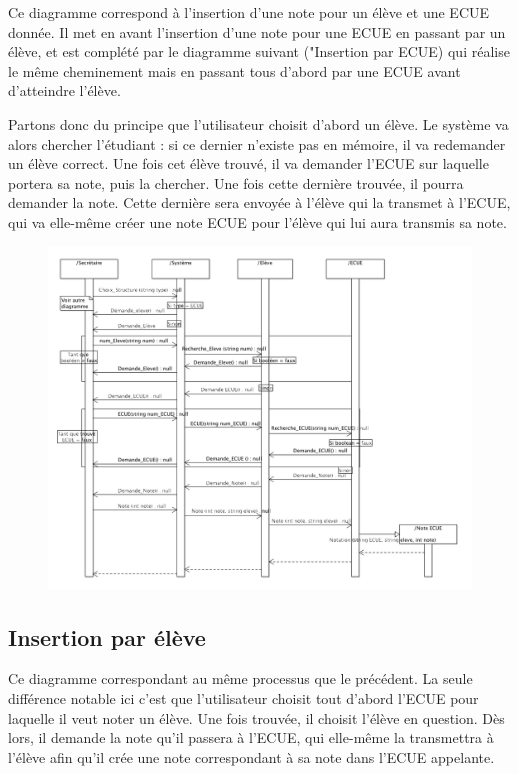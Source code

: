 \documentclass[letter, 11pt] {article}
\begin{document}
		Ce diagramme correspond à l’insertion d’une note pour un élève et une ECUE donnée. Il met en avant l’insertion d’une note pour une ECUE en passant par un élève, et est complété par le diagramme suivant ("Insertion par ECUE) qui réalise le même cheminement mais en passant tous d’abord par une ECUE avant d’atteindre l’élève.
		
		Partons donc du principe que l’utilisateur choisit d’abord un élève. Le système va alors chercher l’étudiant : si ce dernier n’existe pas en mémoire, il va redemander un élève correct. Une fois cet élève trouvé, il va demander l’ECUE sur laquelle portera sa note, puis la chercher. Une fois cette dernière trouvée, il pourra  demander la note. Cette dernière sera envoyée à l’élève qui la transmet à l’ECUE, qui va elle-même créer une note ECUE pour l’élève qui lui aura transmis sa note.
		
		
		\begin{figure}[htbp]
				\includegraphics[scale = 0.53]{../Diagrammes_sequence/Diagramme_sequence_insertion_eleve.png}
		\end{figure}
		
		\newpage
		
		\subsection{Insertion par élève}
		
		Ce diagramme correspondant au même processus que le précédent. La seule différence notable ici c’est que l’utilisateur choisit tout d’abord l’ECUE pour laquelle il veut noter un élève. Une fois trouvée, il choisit l’élève en question. Dès lors, il demande la note qu’il passera à l’ECUE, qui elle-même la transmettra à l’élève afin qu’il crée une note correspondant à sa note dans l’ECUE appelante. 
		
\end{document}
